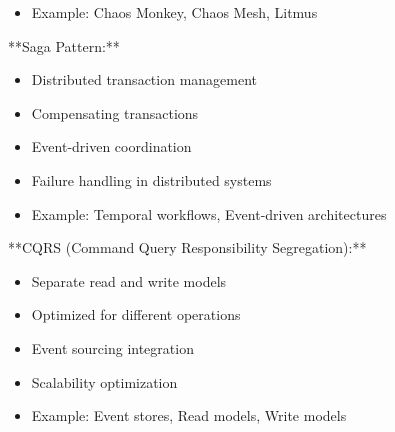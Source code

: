 \documentclass[11pt,a4paper]{article}
\begin{document}
\begin{itemize}
\item Example: Chaos Monkey, Chaos Mesh, Litmus
\end{itemize}

**Saga Pattern:**

\begin{itemize}
\item Distributed transaction management
\end{itemize}

\begin{itemize}
\item Compensating transactions
\end{itemize}

\begin{itemize}
\item Event-driven coordination
\end{itemize}

\begin{itemize}
\item Failure handling in distributed systems
\end{itemize}

\begin{itemize}
\item Example: Temporal workflows, Event-driven architectures
\end{itemize}

**CQRS (Command Query Responsibility Segregation):**

\begin{itemize}
\item Separate read and write models
\end{itemize}

\begin{itemize}
\item Optimized for different operations
\end{itemize}

\begin{itemize}
\item Event sourcing integration
\end{itemize}

\begin{itemize}
\item Scalability optimization
\end{itemize}

\begin{itemize}
\item Example: Event stores, Read models, Write models
\end{itemize}
\end{document}
